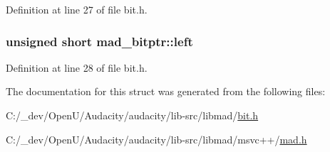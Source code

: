Definition at line 27 of file bit.\+h.

\subsubsection[{\texorpdfstring{left}{left}}]{\setlength{\rightskip}{0pt plus 5cm}unsigned short mad\+\_\+bitptr\+::left}\hypertarget{structmad__bitptr_ade0841b075cdd7a3285e1bd803ef8b95}{}\label{structmad__bitptr_ade0841b075cdd7a3285e1bd803ef8b95}


Definition at line 28 of file bit.\+h.



The documentation for this struct was generated from the following files\+:\begin{DoxyCompactItemize}
\item 
C\+:/\+\_\+dev/\+Open\+U/\+Audacity/audacity/lib-\/src/libmad/\hyperlink{bit_8h}{bit.\+h}\item 
C\+:/\+\_\+dev/\+Open\+U/\+Audacity/audacity/lib-\/src/libmad/msvc++/\hyperlink{lib-src_2libmad_2msvc_09_09_2mad_8h}{mad.\+h}\end{DoxyCompactItemize}
